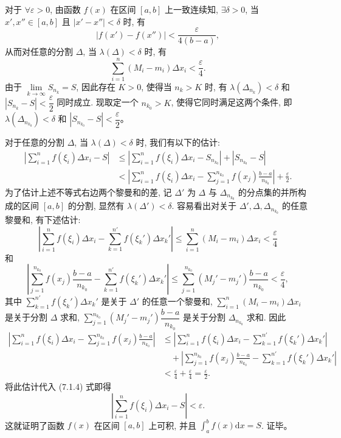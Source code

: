 \documentclass[UTF8, 12pt, fontset=fandol, oneside]{ctexart}
\begin{document}
对于 $\forall\varepsilon>0$, 由函数 $f(x)$ 在区间 $[a,b]$ 上一致连续知, $\exists\delta>0$, 当 $x',x''\in[a,b]$ 且 $|x'-x''|<\delta$ 时, 有
\[
  |f(x')-f(x'')|<\frac{\varepsilon}{4(b-a)},
\]
从而对任意的分割 $\Delta$, 当 $\lambda(\Delta)<\delta$ 时, 有
\[
  \sum_{i=1}^n (M_i-m_i)\Delta x_i<\frac{\varepsilon}{4}.
\]
由于 $\lim\limits_{k\to\infty}S_{n_k}=S$, 因此存在 $K>0$, 使得当 $n_k>K$ 时, 有 $\lambda(\Delta_{n_k})<\delta$ 和 $|S_{n_k}-S|<\dfrac{\varepsilon}{2}$ 同时成立. 现取定一个 $n_{k_0}>K$, 使得它同时满足这两个条件, 即 $\lambda(\Delta_{n_{k_0}})<\delta$ 和 $|S_{n_{k_0}}-S|<\dfrac{\varepsilon}{2}$。

对于任意的分割 $\Delta$, 当 $\lambda(\Delta)<\delta$ 时, 我们有以下的估计:
\begin{equation}
\begin{aligned}
  \left|\sum_{i=1}^n f(\xi_i)\Delta x_i-S\right|
  &\leq \left|\sum_{i=1}^n f(\xi_i)\Delta x_i-S_{n_{k_0}}\right|+|S_{n_{k_0}}-S|\\
  &< \left|\sum_{i=1}^n f(\xi_i)\Delta x_i-\sum_{j=1}^{n_{k_0}} f(x_j)\frac{b-a}{n_{k_0}}\right|+\frac{\varepsilon}{2}.
\end{aligned}
\tag{7.1.4}
\end{equation}
为了估计上述不等式右边两个黎曼和的差, 记 $\Delta'$ 为 $\Delta$ 与 $\Delta_{n_{k_0}}$ 的分点集的并所构成的区间 $[a,b]$ 的分割, 显然有 $\lambda(\Delta')<\delta$. 容易看出对关于 $\Delta',\Delta,\Delta_{n_{k_0}}$ 的任意黎曼和, 有下述估计:
\[
  \left|\sum_{i=1}^n f(\xi_i)\Delta x_i-\sum_{k=1}^{n'}f(\xi_k')\Delta x_k'\right|
  \leq \sum_{i=1}^n(M_i-m_i)\Delta x_i<\frac{\varepsilon}{4}
\]
和
\[
  \left|\sum_{j=1}^{n_{k_0}}f(x_j)\frac{b-a}{n_{k_0}}-\sum_{k=1}^{n'}f(\xi_k')\Delta x_k'\right|
  \leq \sum_{j=1}^{n_{k_0}}(M_j'-m_j')\frac{b-a}{n_{k_0}}<\frac{\varepsilon}{4},
\]
其中 $\sum\limits_{k=1}^{n'}f(\xi_k')\Delta x_k'$ 是关于 $\Delta'$ 的任意一个黎曼和, $\sum\limits_{i=1}^n(M_i-m_i)\Delta x_i$ 是关于分割 $\Delta$ 求和, $\sum\limits_{j=1}^{n_{k_0}}(M_j'-m_j')\dfrac{b-a}{n_{k_0}}$ 是关于分割 $\Delta_{n_{k_0}}$ 求和. 因此
\[
\begin{aligned}
  \left|\sum_{i=1}^n f(\xi_i)\Delta x_i-\sum_{j=1}^{n_{k_0}}f(x_j)\frac{b-a}{n_{k_0}}\right|
  &\leq \left|\sum_{i=1}^n f(\xi_i)\Delta x_i-\sum_{k=1}^{n'}f(\xi_k')\Delta x_k'\right|\\
  &\quad+\left|\sum_{j=1}^{n_{k_0}}f(x_j)\frac{b-a}{n_{k_0}}-\sum_{k=1}^{n'}f(\xi_k')\Delta x_k'\right|\\
  &<\frac{\varepsilon}{4}+\frac{\varepsilon}{4}=\frac{\varepsilon}{2}.
\end{aligned}
\]
将此估计代入 (7.1.4) 式即得
\[
  \left|\sum_{i=1}^n f(\xi_i)\Delta x_i-S\right|<\varepsilon.
\]
这就证明了函数 $f(x)$ 在区间 $[a,b]$ 上可积, 并且 $\int_a^b f(x)\mathrm dx=S$. 证毕。
\end{document}
